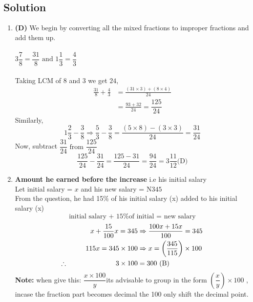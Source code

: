 \subsection{Solution}
\begin{multicols}{2}
\begin{enumerate}[label={\arabic*.}]
    \item \textbf{(D)} We begin by converting all the mixed fractions to improper fractions and add them up.\\\\
    \(3\dfrac{7}{8} = \dfrac{31}{8} \text { and } 1\dfrac{1}{3} = \dfrac{4}{3}\) \\\\
    Taking LCM of \(8\) and \(3\) we get \(24\),
    \begin{align*}
    \frac{31}{8} + \frac{4}{3} &= \frac{(31 \times 3) + (8 \times 4) }{24} \\
    &= \frac{93 + 32}{24} = \dfrac{125}{24}
    \end{align*}
    Similarly, 
    \[1\frac{2}{3} - \frac{3}{8} \Rightarrow \frac{5}{3} - \frac{3}{8} = \frac{(5 \times 8) - (3 \times 3)}{24} = \frac{31}{24}\]
    Now, subtract \(\dfrac{31}{24} \text { from } \dfrac{125}{24}\)
    \[\frac{125}{24} - \frac{31}{24} = \frac{125 - 31}{24} = \frac{94}{24} = 3\frac{11}{12} \text{(D)} \]
    
    \item \textbf{Amount he earned before the increase} i.e his initial salary \\
    Let initial salary = \(x\) and his new salary = N\(345\)\\
    From the question, he had 15\% of his initial salary (x) added to his initial salary (x)
    \[\text{initial salary + 15\% of initial = new salary}\]
    \begin{align*}
    x + \dfrac{15}{100}x = 345 &\Rightarrow \dfrac{100x + 15x}{100} = 345 \\
    115x = 345 \times 100 &\Rightarrow x = \left(\frac{345}{115}\right) \times 100 \\
    \therefore \hspace{70px} 3 \times 100 &= 300 \text{ (B)}\\
    \end{align*}
    \textbf{Note:} when give this: \( \dfrac{x \times 100}{y}\)its advisable to group in the form
    \(\left(\dfrac{x}{y}\right) \times 100\) , incase the fraction part becomes decimal the 100 only shift the
    decimal point. 


\end{enumerate}
\end{multicols}
